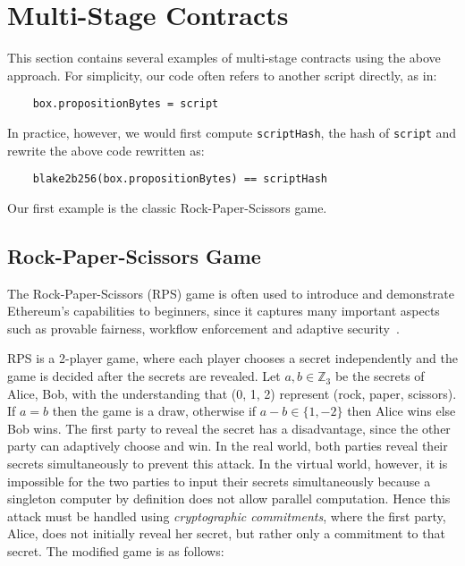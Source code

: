\documentclass[runningheads]{llncs}
\begin{document}
\section{Multi-Stage Contracts}

This section contains several examples of multi-stage contracts using the above approach.
For simplicity, our code often refers to another script directly, as in: 
\begin{verbatim}
    box.propositionBytes = script
\end{verbatim}
   
In practice, however, we would first compute \texttt{scriptHash}, the hash of \texttt{script} and rewrite the above code rewritten as: 
\begin{verbatim}
    blake2b256(box.propositionBytes) == scriptHash
\end{verbatim}

Our first example is the classic Rock-Paper-Scissors game.
\subsection{Rock-Paper-Scissors Game}
\label{rps}

The Rock-Paper-Scissors (RPS) game is often used to introduce and demonstrate Ethereum's capabilities to beginners, since it captures many important
aspects such as provable fairness, workflow enforcement and adaptive security~\cite{rps15}. 

RPS is a 2-player game, where each player chooses a secret independently and the game is decided after the secrets are revealed. 
Let $a, b\in \mathbb{Z}_3$ be the secrets of Alice, Bob, with the understanding that (0, 1, 2) represent (rock, paper, scissors). If $a = b$ then the game is a draw, otherwise if $a-b \in \{1, -2\}$ then Alice wins else Bob wins. 
The first party to reveal the secret has a disadvantage, since the other party can adaptively choose and win. In the real world, both parties reveal their secrets simultaneously to prevent this attack. In the virtual world, however, it is impossible for the two parties to input their secrets simultaneously because a singleton computer by definition does not allow parallel computation. Hence this attack must be handled using {\em cryptographic commitments}, where the first party, Alice, does not initially reveal her secret, but rather only a commitment to that secret. The modified game is as follows:
\end{document}
